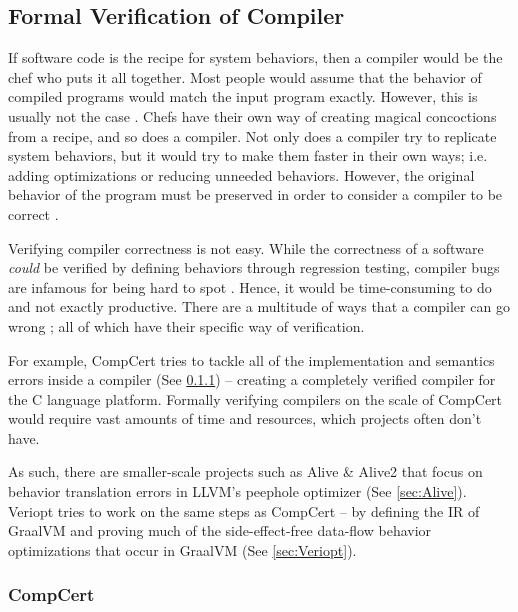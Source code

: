 \subsection{Formal Verification of Compiler}
\label{sec:verification}

If software code is the recipe for system behaviors, then a compiler would be the chef who puts it all together. Most people would assume that 
the behavior of compiled programs would match the input program exactly. However, this is usually not the case \cite{compcertVerification}. 
Chefs have their own way of creating magical concoctions from a recipe, and so does a compiler. Not only does a compiler try to replicate 
system behaviors, but it would try to make them faster in their own ways; i.e. adding optimizations or reducing unneeded behaviors. However, the 
original behavior of the program must be preserved in order to consider a compiler to be correct 
\cite{compcertVerification,AliveInLean,Alive2,Term_Graph_Optimizations}.

Verifying compiler correctness is not easy. While the correctness of a software \emph{could} be verified by defining behaviors through 
regression testing, compiler bugs are infamous for being hard to spot \cite{testing, compcertVerification}. Hence, it would be time-consuming to 
do and not exactly productive. There are a multitude of ways that a compiler can go wrong \cite[Sec. 1.2]{CompilerOptimization}; 
all of which have their specific way of verification. 

For example, CompCert \cite{compcertVerification} tries to tackle all of the implementation and semantics errors inside a compiler 
(See \ref{sec:CompCert}) -- creating a completely verified compiler for the C language platform. Formally verifying compilers on the scale of 
CompCert would require vast amounts of time and resources, which projects often don't have.

As such, there are smaller-scale projects such as Alive \cite{AliveInLean} \& Alive2 \cite{Alive2} that focus on behavior translation errors 
in LLVM's peephole optimizer (See \ref{sec:Alive}). Veriopt tries to work on the same steps as CompCert -- by defining the IR of GraalVM and 
proving much of the side-effect-free data-flow behavior optimizations that occur in GraalVM 
\cite{ATVA21_GraalVM_IR_Semantics,Term_Graph_Optimizations} (See \ref{sec:Veriopt}).

\subsubsection{CompCert}
\label{sec:CompCert}

